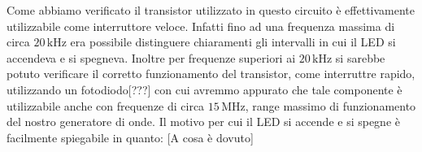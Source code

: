 Come abbiamo verificato il transistor utilizzato in questo circuito è effettivamente utilizzabile come interruttore veloce. Infatti fino ad una frequenza massima di circa $20\,\si{\kilo\hertz}$ era possibile distinguere chiaramenti gli intervalli in cui il LED si accendeva e si spegneva. Inoltre per frequenze superiori ai $20\,\si{\kilo\hertz}$  si sarebbe potuto verificare il corretto funzionamento del transistor, come interruttre rapido, utilizzando un fotodiodo[???] con cui avremmo appurato che tale componente è utilizzabile anche con frequenze di circa $15\,\si{\mega\hertz}$, range massimo di funzionamento del nostro generatore di onde.
Il motivo per cui il LED si accende e si spegne è facilmente spiegabile in quanto: [A cosa è dovuto]
 

\subsection{}

\subsection{}

\subsection{}
